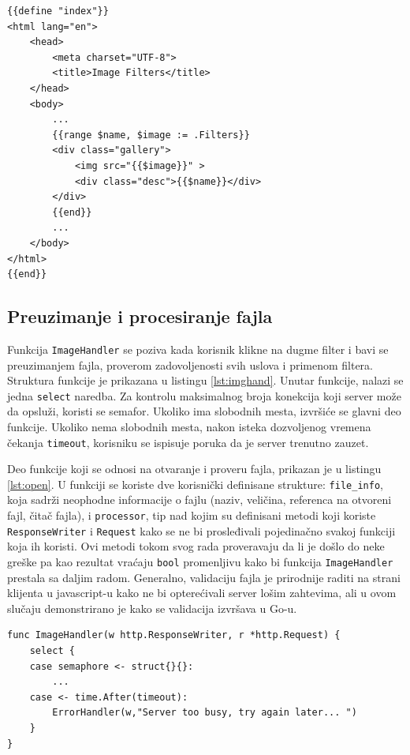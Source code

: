 \documentclass[12pt,oneside]{memoir}
\begin{document}
\begin{center}
\begin{lstlisting}[caption=Izvršavanje HTML šablona,label={lst:tmpl2},  backgroundcolor=\color{background}]
{{define "index"}}
<html lang="en">
	<head>
		<meta charset="UTF-8">
		<title>Image Filters</title>
	</head>
	<body>
		...
		{{range $name, $image := .Filters}}
		<div class="gallery">
			<img src="{{$image}}" >
			<div class="desc">{{$name}}</div>
		</div>
		{{end}}
		...
	</body>
</html>
{{end}}
\end{lstlisting}
\end{center}

\subsection{Preuzimanje i procesiranje fajla}

Funkcija \texttt{ImageHandler} se poziva kada korisnik klikne na dugme filter i bavi se preuzimanjem fajla, proverom zadovoljenosti svih uslova i primenom filtera. Struktura funkcije je prikazana u listingu \ref{lst:imghand}. Unutar funkcije, nalazi se jedna \texttt{select} naredba. Za kontrolu maksimalnog broja konekcija koji server može da opsluži, koristi se semafor. Ukoliko ima slobodnih mesta, izvršiće se glavni deo funkcije. Ukoliko nema slobodnih mesta, nakon isteka dozvoljenog vremena čekanja \texttt{timeout}, korisniku se ispisuje poruka da je server trenutno zauzet. 
 
Deo funkcije koji se odnosi na otvaranje i proveru fajla, prikazan je u listingu \ref{lst:open}. U funkciji se koriste dve korisnički definisane strukture: \texttt{file\_info}, koja sadrži neophodne informacije o fajlu (naziv, veličina, referenca na otvoreni fajl, čitač fajla), i \texttt{processor}, tip nad kojim su definisani metodi koji koriste \texttt{ResponseWriter} i \texttt{Request} kako se ne bi prosleđivali pojedinačno svakoj funkciji koja ih koristi. Ovi metodi tokom svog rada proveravaju da li je došlo do neke greške pa kao rezultat vraćaju \texttt{bool} promenljivu kako bi funkcija \texttt{ImageHandler} prestala sa daljim radom. Generalno, validaciju fajla je prirodnije raditi na strani klijenta u javascript-u kako ne bi opterećivali server lošim zahtevima, ali u ovom slučaju demonstrirano je kako se validacija izvršava u Go-u.

\begin{center}
\begin{lstlisting}[caption=Struktura ImageHandler funkcije,label={lst:imghand},  backgroundcolor=\color{background}]
func ImageHandler(w http.ResponseWriter, r *http.Request) {
	select {
	case semaphore <- struct{}{}:
		...
	case <- time.After(timeout):
		ErrorHandler(w,"Server too busy, try again later... ")
	}
}

\end{lstlisting}
\end{center}
\end{document}
